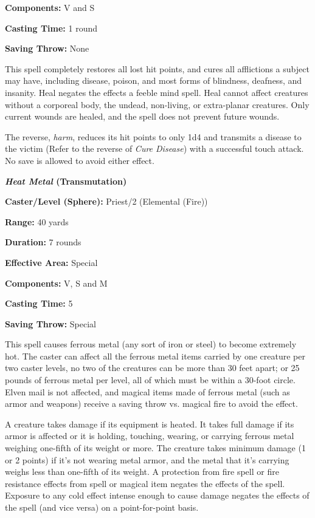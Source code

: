 \begin{multicols}{2}
\begin{minipage}{\columnwidth}
\noindent \textbf{Components:} V and S

\noindent \textbf{Casting Time:} 1 round

\noindent \textbf{Saving Throw:} None

\end{minipage}

This spell completely restores all lost hit points, and cures all afflictions a subject may have, including disease, poison, and most forms of blindness, deafness, and insanity.  Heal negates the effects a feeble mind spell.  Heal cannot affect creatures without a corporeal body, the undead, non-living, or extra-planar creatures.  Only current wounds are healed, and the spell does not prevent future wounds.

The reverse, \textit{harm}, reduces its hit points to only 1d4 and transmits a disease to the victim (Refer to the reverse of \textit{Cure Disease}) with a successful touch attack.  No save is allowed to avoid either effect.  

\vspace{1em}

\noindent
\begin{minipage}{\columnwidth}

\noindent \textbf{\textit{Heat Metal} (Transmutation)}

\noindent \textbf{Caster/Level (Sphere):} Priest/2 (Elemental (Fire))

\noindent \textbf{Range:} 40 yards

\noindent \textbf{Duration:} 7 rounds

\noindent \textbf{Effective Area:} Special

\noindent \textbf{Components:} V, S and M

\noindent \textbf{Casting Time:} 5

\noindent \textbf{Saving Throw:} Special

\end{minipage}

This spell causes ferrous metal (any sort of iron or steel) to become extremely hot.  The caster can affect all the ferrous metal items carried by one creature per two caster levels, no two of the creatures can be more than 30 feet apart; or 25 pounds of ferrous metal per level, all of which must be within a 30-foot circle.  Elven mail is not affected, and magical items made of ferrous metal (such as armor and weapons) receive a saving throw vs. magical fire to avoid the effect.
 
A creature takes damage if its equipment is heated.  It takes full damage if its armor is affected or it is holding, touching, wearing, or carrying ferrous metal weighing one-fifth of its weight or more.  The creature takes minimum damage (1 or 2 points) if it's not wearing metal armor, and the metal that it's carrying weighs less than one-fifth of its weight.  A protection from fire spell or fire resistance effects from spell or magical item negates the effects of the spell.  Exposure to any cold effect intense enough to cause damage negates the effects of the spell (and vice versa) on a point-for-point basis.


\end{multicols}
